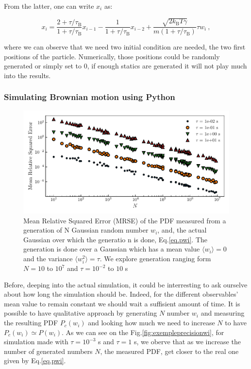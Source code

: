 From the latter, one can write $x_i$ as:

\begin{equation}	
	x_i = \frac{2 + \tau /\tau_\mathrm{B}}{1 + \tau / \tau_\mathrm{B} } x_{i-1} 
	- \frac{1}{1 + \tau / \tau_\mathrm{B}}x_{i-2}
	+ \frac{\sqrt{2k_\mathrm{B}T\gamma}}{m(1 + \tau/\tau_\mathrm{B})} \tau w_i ~,
	\label{Eq.numfulllangevin}
\end{equation}

where we can observe that we need two initial condition are needed, the two first positions of  the particle. Numerically, those positions could be randomly generated or simply set to $0$, if enough statics are generated it will not play much into the results.

\subsubsection{Simulating Brownian motion using Python}

\begin{figure}[h]
	\centering
	\includegraphics{02_body/chapter1/image/noise_simulation/MSE.pdf}
	\caption{Mean Relative Squared Error (\gls{MRSE}) of the \gls{PDF} measured from a generation of N Gaussian random number $w_i$, and, the actual Gaussian over which the generatio n is done, Eq.\ref{eq.pwi}. The generation is done over a Gaussian which has a mean value $\langle w_i \rangle =0$ and the variance $\langle w_i^2 \rangle = \tau$. We explore generation ranging form $N = 10$ to $10^7$ and $\tau = 10^{-2}$ to $10$ s}  
	\label{fig:MSEwi}
\end{figure}

Before, deeping into the actual simulation, it could be interresting to ask ourselve about how long the simulation should be. Indeed, for the different observables' mean value to remain constant we should wait a suffisient amount of time. It is possible to have qualitative approach by generating $N$ number $w_i$ and measuring the resulting \gls{PDF} $P_c(w_i)$ and looking how much we need to increase $N$ to have $P_c(w_i) \simeq P(w_i)$. As we can see on the Fig.\ref{fig:exempleprecisionwi}, for simulation made with $\tau = 10^{-3}$ s and $\tau = 1$ s, we oberve that as we increase the number of generated numbers $N$, the measured PDF, get closer to the real one given by Eq.\ref{eq.pwi}. 




